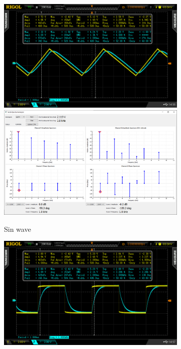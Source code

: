 \documentclass[notitlepage, a4paper, 11pt]{article}
\begin{document}
	\begin{figure}[H]
		\centering
		\begin{subfigure}[][][t]{0.45\textwidth}
			\includegraphics[width=\textwidth, trim=85 50 112 45, clip]{../img/osc/DS2_QuickPrint1.png}
			\includegraphics[width=\textwidth, trim=10 80 10 100, clip]{../img/Circuit1/dut50}
			\caption{Sin wave}
		\end{subfigure}
		\begin{subfigure}[][][t]{0.45\textwidth}
			\includegraphics[width=\textwidth, trim=85 50 112 45, clip]{../img/osc/DS2_QuickPrint4.png}

\end{subfigure}
\end{figure}
\end{document}
